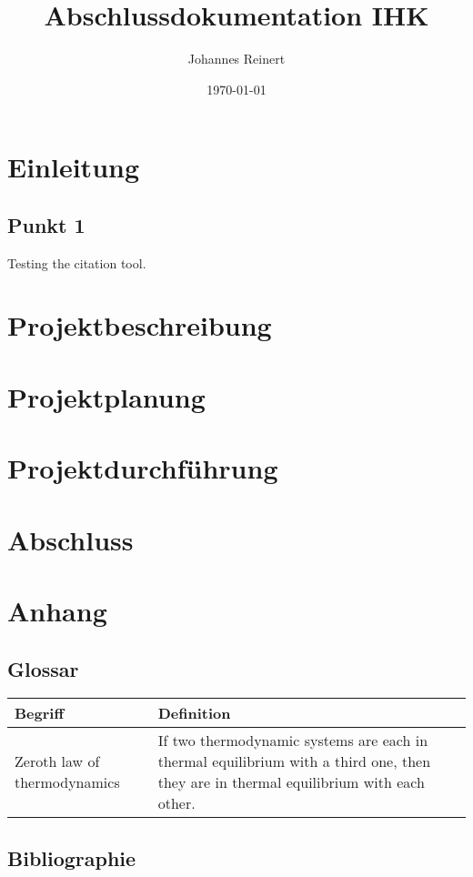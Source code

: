 \documentclass[a4paper]{article}
\title{Abschlussdokumentation IHK}
\author{Johannes Reinert}
\date{\today}
\begin{document}
\maketitle
\newpage

\tableofcontents

\newpage

\section{Einleitung}
\subsection{Punkt 1}

Testing the citation \cite{test} tool.

\section{Projektbeschreibung}

\section{Projektplanung}

\section{Projektdurchführung}

\section{Abschluss}

\section{Anhang}

\subsection{Glossar}
    \begin{tabularx}{\textwidth}{
            || X | X ||}
        \hline

        Begriff & Definition \\
        \hline\hline

        Zeroth law of thermodynamics & If two thermodynamic systems are each in thermal equilibrium with
        a third one, then they are in thermal equilibrium with each other. \\
        \hline

    \end{tabularx}

\subsection{Bibliographie}
\printbibliography
\end{document}
